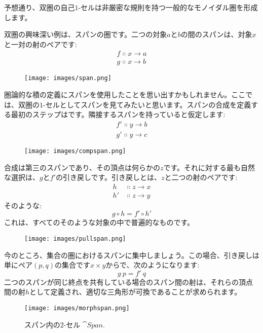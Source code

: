 予想通り、双圏の自己$1$-セルは非厳密な規則を持つ一般的なモノイダル圏を形成します。

双圏の興味深い例は、スパンの圏です。二つの対象$a$と$b$の間のスパンは、対象$x$と一対の射のペアです: 
\begin{gather*}
  f \Colon x \to a \\
  g \Colon x \to b
\end{gather*}

\begin{figure}[H]
  \centering
  \texttt{[image: images/span.png]}
\end{figure}

\noindent
圏論的な積の定義にスパンを使用したことを思い出すかもしれません。ここでは、双圏の$1$-セルとしてスパンを見てみたいと思います。スパンの合成を定義する最初のステップはです。隣接するスパンを持っていると仮定します: 
\begin{gather*}
  f' \Colon y \to b \\
  g' \Colon y \to c
\end{gather*}

\begin{figure}[H]
  \centering
  \texttt{[image: images/compspan.png]}
\end{figure}

\noindent
合成は第三のスパンであり、その頂点は何らかの$z$です。それに対する最も自然な選択は、$g$と$f'$の引き戻しです。引き戻しとは、$z$と二つの射のペアです: 
\begin{align*}
  h  & \Colon z \to x \\
  h' & \Colon z \to y
\end{align*}
そのような: 
\[g \circ h = f' \circ h'\]
これは、すべてのそのような対象の中で普遍的なものです。

\begin{figure}[H]
  \centering
  \texttt{[image: images/pullspan.png]}
\end{figure}

\noindent
今のところ、集合の圏におけるスパンに集中しましょう。この場合、引き戻しは単にペア$(p, q)$の集合です$x \times y$からで、次のようになります: 
\[g\ p = f'\ q\]
二つのスパンが同じ終点を共有している場合のスパン間の射は、それらの頂点間の射$h$として定義され、適切な三角形が可換であることが求められます。

\begin{figure}[H]
  \centering
  \texttt{[image: images/morphspan.png]}
  \caption{スパン内の$2$-セル $\cat{Span}$.}
\end{figure}

